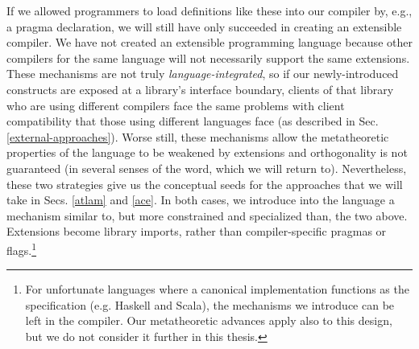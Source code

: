 If we allowed programmers to load definitions like these into our compiler by, e.g., a pragma declaration, we will still have only succeeded in creating an extensible compiler. We have not created an extensible programming language because other compilers for the same language will not necessarily support the same extensions. These mechanisms are not truly \emph{language-integrated}, so if our newly-introduced constructs are exposed at a library's  interface boundary, clients of that library who are using different compilers face the same problems with client compatibility that those using different languages face (as described in Sec. \ref{external-approaches}). Worse still, these mechanisms allow the  metatheoretic properties of the language to be weakened by extensions and orthogonality is not guaranteed (in several senses of the word, which we will return to). %
Nevertheless, these two strategies give us the conceptual seeds for the approaches that we will take in Secs. \ref{atlam} and \ref{ace}. 
In both cases, we introduce into the language a mechanism similar to, but more constrained and specialized  than, the two above. Extensions become library imports, rather than compiler-specific pragmas or flags.\footnote{For unfortunate languages where a canonical implementation functions as the specification (e.g. Haskell and Scala), the mechanisms we introduce can be left in the compiler. Our metatheoretic advances apply also to this design, but we do not consider it further in this thesis.}




